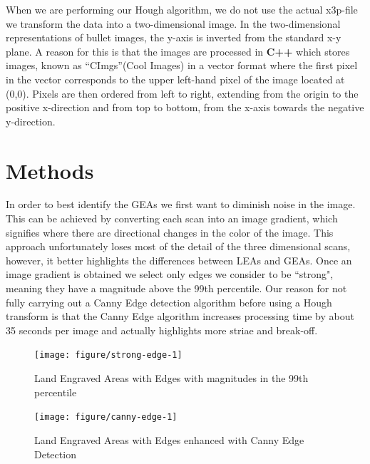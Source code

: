 \documentclass[12pt]{article}\usepackage[]{graphicx}\usepackage[]{color}
\newenvironment{knitrout}{}{} %
\theoremstyle{nonumberplain}
\begin{document}
 When we are performing our Hough algorithm, we do not use the actual x3p-file we transform the data into a two-dimensional image. In the two-dimensional representations of bullet images, the y-axis is inverted from the standard x-y plane. A reason for this is that the images are processed in \textbf{C++} which stores images, known as ``CImgs''(Cool Images) in a vector format where the first pixel in the vector corresponds to the upper left-hand pixel of the image located at (0,0). Pixels are then ordered from left to right, extending from the origin to the positive x-direction and from top to bottom, from the x-axis towards the negative y-direction.
 
\section{Methods}


In order to best identify the GEAs we first want to diminish noise in the image. This can be achieved by converting each scan into an image gradient, which signifies where there are directional changes in the color of the image. This approach unfortunately loses most of the detail of the three dimensional scans, however, it better highlights the differences between LEAs and GEAs. Once an image gradient is obtained we select only edges we consider to be ``strong", meaning they have a magnitude above the 99th percentile. Our reason for not fully carrying out a Canny Edge detection algorithm before using a Hough transform is that the Canny Edge algorithm increases processing time by about 35 seconds per image and actually highlights more striae and break-off. 

\begin{knitrout}
\color{fgcolor}\begin{figure}

{\centering \texttt{[image: figure/strong-edge-1]} 

}

\caption[Land Engraved Areas with Edges with magnitudes in the 99th percentile]{Land Engraved Areas with Edges with magnitudes in the 99th percentile}\label{fig:strong-edge}
\end{figure}


\end{knitrout}

\begin{knitrout}
\color{fgcolor}\begin{figure}

{\centering \texttt{[image: figure/canny-edge-1]} 

}

\caption[Land Engraved Areas with Edges enhanced with Canny Edge Detection]{Land Engraved Areas with Edges enhanced with Canny Edge Detection}\label{fig:canny-edge}
\end{figure}


\end{knitrout}
\end{document}
